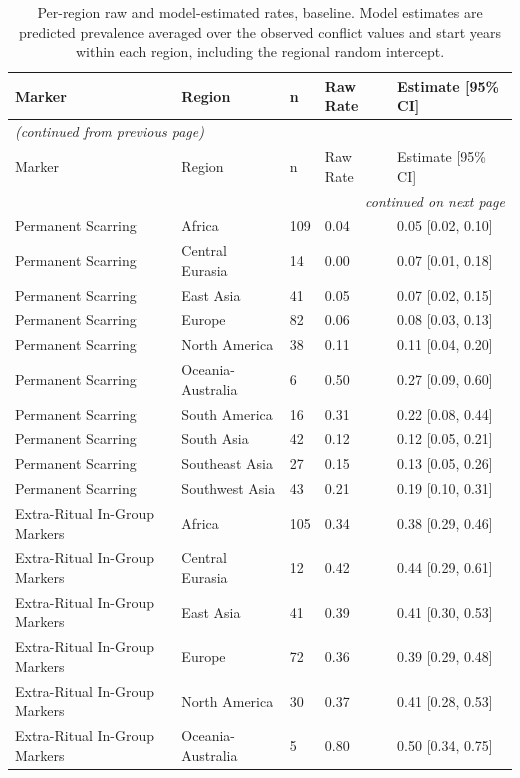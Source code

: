 \small
\begin{longtable}{lllll}
\caption{Per-region raw and model-estimated rates, baseline. Model estimates are predicted prevalence averaged over the observed conflict values and start years within each region, including the regional random intercept.} \label{tab:intonly_region_effects_baseline} \\
\toprule
Marker & Region & n & Raw Rate & Estimate [95\% CI] \\
\midrule
\endfirsthead
\multicolumn{5}{l}{\small\itshape (continued from previous page)} \\
\toprule
Marker & Region & n & Raw Rate & Estimate [95\% CI] \\
\midrule
\endhead
\midrule
\multicolumn{5}{r}{\small\itshape continued on next page} \\
\endfoot
\bottomrule
\endlastfoot
Permanent Scarring & Africa & 109 & 0.04 & 0.05 [0.02, 0.10] \\
Permanent Scarring & Central Eurasia & 14 & 0.00 & 0.07 [0.01, 0.18] \\
Permanent Scarring & East Asia & 41 & 0.05 & 0.07 [0.02, 0.15] \\
Permanent Scarring & Europe & 82 & 0.06 & 0.08 [0.03, 0.13] \\
Permanent Scarring & North America & 38 & 0.11 & 0.11 [0.04, 0.20] \\
Permanent Scarring & Oceania-Australia & 6 & 0.50 & 0.27 [0.09, 0.60] \\
Permanent Scarring & South America & 16 & 0.31 & 0.22 [0.08, 0.44] \\
Permanent Scarring & South Asia & 42 & 0.12 & 0.12 [0.05, 0.21] \\
Permanent Scarring & Southeast Asia & 27 & 0.15 & 0.13 [0.05, 0.26] \\
Permanent Scarring & Southwest Asia & 43 & 0.21 & 0.19 [0.10, 0.31] \\
Extra-Ritual In-Group Markers & Africa & 105 & 0.34 & 0.38 [0.29, 0.46] \\
Extra-Ritual In-Group Markers & Central Eurasia & 12 & 0.42 & 0.44 [0.29, 0.61] \\
Extra-Ritual In-Group Markers & East Asia & 41 & 0.39 & 0.41 [0.30, 0.53] \\
Extra-Ritual In-Group Markers & Europe & 72 & 0.36 & 0.39 [0.29, 0.48] \\
Extra-Ritual In-Group Markers & North America & 30 & 0.37 & 0.41 [0.28, 0.53] \\
Extra-Ritual In-Group Markers & Oceania-Australia & 5 & 0.80 & 0.50 [0.34, 0.75] \\

\end{longtable}
